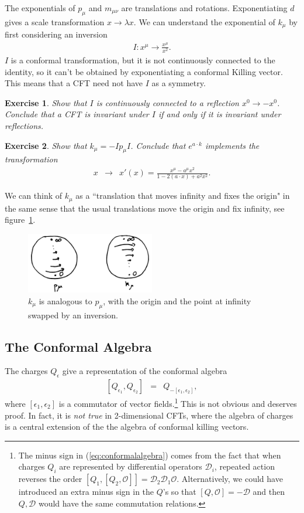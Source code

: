 \documentclass{ws-rv9x6}
\newcommand\be{\begin{eqnarray}}
\newcommand\ee{\end{eqnarray}}
\newcommand\cO{\mathcal{O}}
\newcommand\e\epsilon
\newcommand\<\langle
\renewcommand\>\rangle
\renewcommand\.{\cdot}
\newcommand\cD{\mathcal{D}}
\newtheorem{exercise}{Exercise}[section]
\begin{document}
The exponentials of $p_\mu$ and $m_{\mu\nu}$ are translations and rotations. Exponentiating $d$ gives a scale transformation $x\to \lambda x$.  
We can understand the exponential of $k_\mu$ by first considering an inversion
\be
I:x^\mu \to \frac{x^\mu}{x^2}.
\ee
$I$ is a conformal transformation, but it is not continuously connected to the identity, so it can't be obtained by exponentiating a conformal Killing vector. This means that a CFT need not have $I$ as a symmetry.
\begin{exercise}
Show that $I$ is continuously connected to a reflection $x^0\to -x^0$.  Conclude that a CFT is invariant under $I$ if and only if it is invariant under reflections.
\end{exercise}

\begin{exercise}
Show that $k_\mu = -I p_\mu I$. Conclude that $e^{a\.k}$ implements the transformation
\be
\label{eq:finitespecialconformal}
x &\to& x'(x)=\frac{x^\mu-a^\mu x^2}{1-2(a\.x)+a^2 x^2}.
\ee
\end{exercise}
We can think of $k_\mu$ as a ``translation that moves infinity and fixes the origin" in the same sense that the usual translations move the origin and fix infinity, see figure~\ref{fig:translationnearinfinity}.

\begin{figure}
\begin{center}
\includegraphics[width=0.5\textwidth]{translationnearinfinity.jpg}
\end{center}
\caption{\label{fig:translationnearinfinity} $k_\mu$ is analogous to $p_\mu$, with the origin and the point at infinity swapped by an inversion.}
\end{figure}

\subsection{The Conformal Algebra}

The charges $Q_\e$ give a representation of the conformal algebra
\be
\label{eq:conformalalgebra}
[Q_{\e_1},Q_{\e_2}] &=& Q_{-[\e_1,\e_2]},
\ee
where $[\e_1,\e_2]$ is a commutator of vector fields.\footnote{The minus sign in (\ref{eq:conformalalgebra}) comes from the fact that when charges $Q_i$ are represented by differential operators $\cD_i$, repeated action reverses the order $[Q_1,[Q_2,\cO]]=\cD_2 \cD_1 \cO$.  Alternatively, we could have introduced an extra minus sign in the $Q$'s so that $[Q,\cO]=-\cD$ and then $Q,\cD$ would have the same commutation relations.}  This is not obvious and deserves proof. In fact, it is {\it not true\/} in 2-dimensional CFTs, where the algebra of charges is a central extension of the the algebra of conformal killing vectors.
\end{document}
